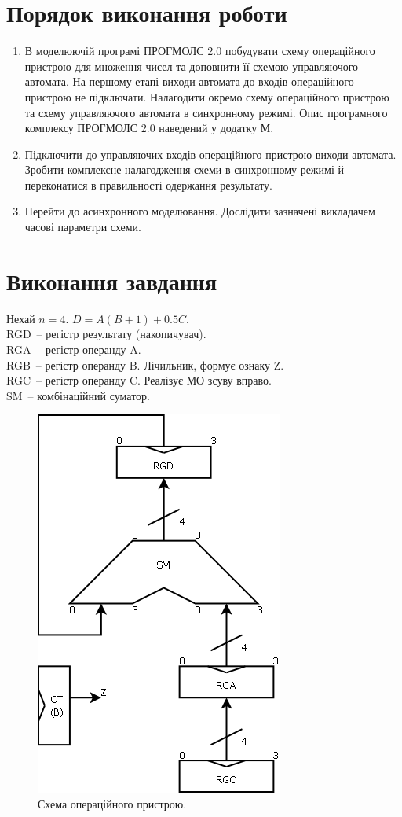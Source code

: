 \documentclass[a4paper, 10pt]{article}
\begin{document}
\section{Порядок виконання роботи}
\begin{enumerate}
    \item В моделюючій програмі ПРОГМОЛС 2.0 побудувати схему операційного пристрою для множення чисел та доповнити її схемою управляючого автомата. На першому етапі виходи автомата до входів операційного пристрою не підключати. Налагодити окремо схему операційного пристрою та схему управляючого автомата в синхронному режимі. Опис програмного комплексу ПРОГМОЛС 2.0 наведений у додатку М.
    \item Підключити до управляючих входів операційного пристрою виходи автомата. Зробити комплексне налагодження схеми в синхронному режимі й переконатися в правильності одержання результату.
    \item Перейти до асинхронного моделювання. Дослідити зазначені викладачем часові параметри схеми.
\end{enumerate}

\section{Виконання завдання}
Нехай $n=4$. $D=A(B+1)+0.5C$.\\
RGD~-- регістр результату (накопичувач).\\
RGA~-- регістр операнду A.\\
RGB~-- регістр операнду B. Лічильник, формує ознаку Z.\\
RGC~-- регістр операнду C. Реалізує МО зсуву вправо.\\
SM~-- комбінаційний суматор.
\begin{figure}[h!]
\begin{center}
\includegraphics[scale=0.5]{od.png}
\caption{Схема операційного пристрою.}
\end{center}
\end{figure}
\end{document}
